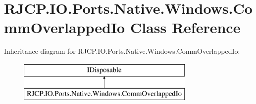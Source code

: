 \hypertarget{class_r_j_c_p_1_1_i_o_1_1_ports_1_1_native_1_1_windows_1_1_comm_overlapped_io}{}\section{R\+J\+C\+P.\+I\+O.\+Ports.\+Native.\+Windows.\+Comm\+Overlapped\+Io Class Reference}
\label{class_r_j_c_p_1_1_i_o_1_1_ports_1_1_native_1_1_windows_1_1_comm_overlapped_io}
Inheritance diagram for R\+J\+C\+P.\+I\+O.\+Ports.\+Native.\+Windows.\+Comm\+Overlapped\+Io\+:\begin{figure}[H]
\begin{center}
\leavevmode
\includegraphics[height=2.000000cm]{class_r_j_c_p_1_1_i_o_1_1_ports_1_1_native_1_1_windows_1_1_comm_overlapped_io}
\end{center}
\end{figure}
